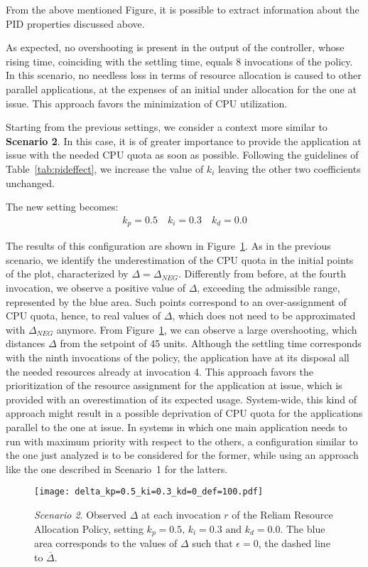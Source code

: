 From the above mentioned Figure, it is possible to extract information about the PID properties discussed above.

As expected, no overshooting is present in the output of the controller, whose rising time, coinciding with the settling time, equals 8 invocations of the policy. In this scenario, no needless loss in terms of resource allocation is caused to other parallel applications, at the expenses of an initial under allocation for the one at issue. This approach favors the minimization of CPU utilization.

Starting from the previous settings, we consider a context more similar to \textbf{Scenario 2}. In this case, it is of greater importance to provide the application at issue with the needed CPU quota as soon as possible. Following the guidelines of Table~\ref{tab:pideffect}, we increase the value of $k_i$ leaving the other two coefficients unchanged.

The new setting becomes:
\begin{align*}
    k_p = 0.5 \quad k_i = 0.3 \quad k_d = 0.0
\end{align*}

The results of this configuration are shown in Figure~\ref{fig:pid530}.
As in the previous scenario, we identify the underestimation of the CPU quota in the initial points of the plot, characterized by $\Delta=\Delta_{NEG}$. Differently from before, at the fourth invocation, we observe a positive value of $\Delta$, exceeding the admissible range, represented by the blue area. Such points correspond to an over-assignment of CPU quota, hence, to real values of $\Delta$, which does not need to be approximated with $\Delta_{NEG}$ anymore. From Figure~\ref{fig:pid530}, we can observe a large overshooting, which distances $\Delta$ from the setpoint of 45 units. Although the settling time corresponds with the ninth invocations of the policy, the application have at its disposal all the needed resources already at invocation 4. This approach favors the prioritization of the resource assignment for the application at issue, which is provided with an overestimation of its expected usage. System-wide, this kind of approach might result in a possible deprivation of CPU quota for the applications parallel to the one at issue. In systems in which one main application needs to run with maximum priority with respect to the others, a configuration similar to the one just analyzed is to be considered for the former, while using an approach like the one described in Scenario~1 for the latters.
\begin{figure}[t]
    \centering
    \texttt{[image: delta\_kp=0.5\_ki=0.3\_kd=0\_def=100.pdf]}
    \caption{\emph{Scenario 2}. Observed $\Delta$ at each invocation $r$ of the Reliam Resource Allocation Policy, setting $k_{p}=0.5\text{, }k_{i}=0.3\text{ and }k_{d}=0.0$. The blue area corresponds to the values of $\Delta$ such that $\epsilon=0$, the dashed line to $\overline{\Delta}$.}
    \label{fig:pid530}
\end{figure}

